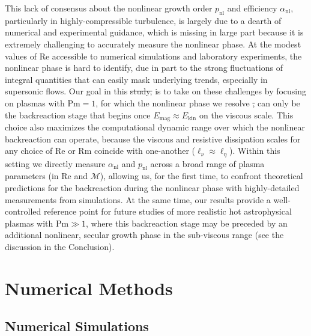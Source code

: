 \documentclass[12pt,twoside]{extreport}
\makeatletter
\newcommand{\mReh}{\ensuremath{\mathrm{Re}}} %
\newcommand{\mRem}{\ensuremath{\mathrm{Rm}}} %
\newcommand{\mPrm}{\ensuremath{\mathrm{Pm}}} %
\newcommand{\mSonicMach}{\ensuremath{\mathcal{M}}} %
\providecommand{\DIFaddtex}[1]{{\protect\color{DIFgreen}\uwave{#1}}} %
\providecommand{\DIFdeltex}[1]{{\protect\color{DIFpurple}\sout{#1}}} %
\providecommand{\DIFaddbegin}{} %
\providecommand{\DIFaddend}{} %
\providecommand{\DIFdelbegin}{} %
\providecommand{\DIFdelend}{} %
\providecommand{\DIFadd}[1]{\texorpdfstring{\DIFaddtex{#1}}{#1}} %
\providecommand{\DIFdel}[1]{\texorpdfstring{\DIFdeltex{#1}}{}} %
\providecommand{\DIFscaledelfig}{0.5}
\newlength{\DIFdelgraphicswidth} %
\newlength{\DIFdelgraphicsheight} %
\providecommand{\DIFaddincludegraphics}[2][]{{\color{DIFgreen}\fbox{\DIFOincludegraphics[#1]{#2}}}} %
\providecommand{\DIFdelincludegraphics}[2][]{%
\sbox{\DIFdelgraphicsbox}{\DIFOincludegraphics[#1]{#2}}%
\settoboxwidth{\DIFdelgraphicswidth}{\DIFdelgraphicsbox} %
\settoboxtotalheight{\DIFdelgraphicsheight}{\DIFdelgraphicsbox} %
\scalebox{\DIFscaledelfig}{%
\parbox[b]{\DIFdelgraphicswidth}{\usebox{\DIFdelgraphicsbox}\\[-\baselineskip] \rule{\DIFdelgraphicswidth}{0em}}\llap{\resizebox{\DIFdelgraphicswidth}{\DIFdelgraphicsheight}{%
\setlength{\unitlength}{\DIFdelgraphicswidth}%
\begin{picture}(1,1)%
\thicklines\linethickness{2pt} %
{\color{DIFpurple}\put(0,0){\framebox(1,1){}}}%
{\color{DIFpurple}\put(0,0){\line( 1,1){1}}}%
{\color{DIFpurple}\put(0,1){\line(1,-1){1}}}%
\end{picture}%
}\hspace*{3pt}}} %
} %
\DeclareRobustCommand{\DIFaddbegin}{\DIFOaddbegin \let\includegraphics\DIFaddincludegraphics} %
\DeclareRobustCommand{\DIFaddend}{\DIFOaddend \let\includegraphics\DIFOincludegraphics} %
\DeclareRobustCommand{\DIFdelbegin}{\DIFOdelbegin \let\includegraphics\DIFdelincludegraphics} %
\DeclareRobustCommand{\DIFdelend}{\DIFOaddend \let\includegraphics\DIFOincludegraphics} %
\let\sout@orig\sout %
\renewcommand{\sout}[1]{\ifmmode\text{\sout@orig{\ensuremath{#1}}}\else\sout@orig{#1}\fi} %
\makeatother
\begin{document}
    This lack of consensus about the nonlinear growth order $p_\mathrm{nl}$ and efficiency $\alpha_\mathrm{nl}$, particularly in highly-compressible turbulence, is largely due to a dearth of numerical and experimental guidance, which is missing in large part because it is extremely challenging to accurately measure the nonlinear phase. At the modest values of $\mReh$ accessible to numerical simulations and laboratory experiments, the nonlinear phase is hard to identify, due in part to the strong fluctuations of integral quantities that can easily mask underlying trends, especially in supersonic flows. Our goal in this \DIFdelbegin \DIFdel{study, }\DIFdelend \DIFaddbegin \DIFadd{chapter }\DIFaddend is to take on these challenges by focusing on plasmas with $\mPrm = 1$, for which the nonlinear phase we resolve \DIFdelbegin \DIFdel{, }\DIFdelend can only be the backreaction stage that begins once $E_\mathrm{mag} \approx E_\mathrm{kin}$ on the viscous scale. This choice also maximizes the computational dynamic range over which the nonlinear backreaction can operate, because the viscous and resistive dissipation scales for any choice of $\mReh$ or $\mRem$ coincide with one-another ($\ell_\nu \approx \ell_\eta$). Within this setting we directly measure $\alpha_\mathrm{nl}$ and $p_\mathrm{nl}$ across a broad range of plasma parameters (in $\mReh$ and $\mSonicMach$), allowing us, for the first time, to confront theoretical predictions for the backreaction during the nonlinear phase with highly-detailed measurements from simulations. At the same time, our results provide a well-controlled reference point for future studies of more realistic hot astrophysical plasmas with $\mPrm \gg 1$, where this backreaction stage may be preceded by an additional nonlinear, secular growth phase in the sub-viscous range (see the discussion in the Conclusion).

\section{Numerical Methods}

\subsection{Numerical Simulations} \label{sec:methods:sims}
\end{document}

